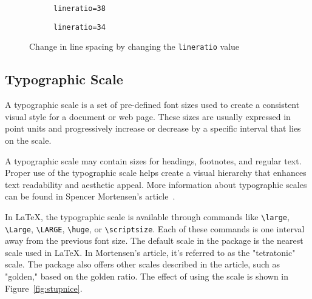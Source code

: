 \documentclass{ltugboat}
\begin{document}
\begin{figure*}[tbp]
  \begin{subfigure}[b]{0.45\textwidth}
\caption{\texttt{lineratio=38}}
\end{subfigure}
\begin{subfigure}[b]{0.45\textwidth}
\caption{\texttt{lineratio=34}}
\end{subfigure}
  \caption{Change in line spacing by changing the \texttt{lineratio} value}\label{fig:lineratio}
\end{figure*}

\subsection{Typographic Scale}

A typographic scale is a set of pre-defined font sizes used to create a
consistent visual style for a document or web page. These sizes are usually
expressed in point units and progressively increase or decrease by a specific
interval that lies on the scale.

A typographic scale may contain sizes for headings, footnotes, and regular
text. Proper use of the typographic scale helps create a visual hierarchy that
enhances text readability and aesthetic appeal. More information about
typographic scales can be found in Spencer Mortensen's
article~\cite{mortensen}.

In \LaTeX, the typographic scale is available through commands like
\verb|\large|, \verb|\Large|, \verb|\LARGE|, \verb|\huge|, or
\verb|\scriptsize|. Each of these commands is one interval away from the
previous font size. The default scale in the  package is the
nearest scale used in \LaTeX. In Mortensen's article, it's referred to as the
"tetratonic" scale. The package also offers other scales described in the
article, such as "golden," based on the golden ratio. The effect of using the
scale is shown in Figure~\ref{fig:stupnice}.
\end{document}
